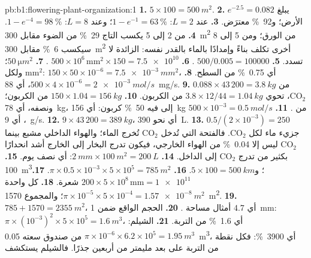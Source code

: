 \begin{solution}{pb:b1:flowering-plant-organization:1}
\textbf{1.} $5\times 100 = \qty{500}{m^2}$.
\textbf{2.} $e^{-2.5} = 0.082$ يبلغ الأرض؛ و\qty{92}{\%} معترَض.
\textbf{3.} عند $L = 2$: $1 - e^{-1} = \qty{63}{\%}$؛ وعند $L = 8$:
$1 -
e^{-4} = \qty{98}{\%}$.
\textbf{4.} من 2 إلى 5 يكسب التاج \qty{29}{\%} من الضوء مقابل
\qty{300}{m^2} من الورق؛ ومن 5 إلى 8 سيكسب \qty{6}{\%} مقابل
\qty{300}{m^2} أخرى تكلف بناءً وإمدادًا بالماء بالقدر نفسه: 
الزائدة لا تسدد.
\textbf{5.} $500/0.005 = \num{100000}$ .
\textbf{6.} $500\times 10^6\,\mathrm{mm^2}\times 150 = \num{7.5e10}$
.
\textbf{7.} $\qty{50}{\micro m^2}$؛ ولكل mm$^2$:
$150\times 50\times
10^{-6} = \qty{7.5e-3}{mm^2}$، أي \qty{0.75}{\%}
من السطح.
\textbf{8.} $500\times 4\times 10^{-6} = \qty{2e-3}{mol/s}$، أي
\qty{88}{mg/s}.
\textbf{9.} $0.088\times 43\,200 = \qty{3.8}{kg}$ من
$\mathrm{CO_2}$، تحوي $3.8\times 12/44 = \qty{1.04}{kg}$ من الكربون.
\textbf{10.} $150\times 1.04 = \qty{156}{kg}$ من الكربون؛ ونصفه، أي
\qty{78}{kg}، إلى  فيه \qty{50}{\%} كربون: أي \qty{156}{kg} من
.
\textbf{11.} $500\times 10^{-3} = \qty{0.5}{mol/s}$، أي \qty{9}{g/s}.
\textbf{12.} $9\times 43\,200 = \qty{389}{kg}$، أي نحو \qty{390}{L}.
\textbf{13.} $0.5/(2\times 10^{-3}) = 250$ جزيء ماء لكل
$\mathrm{CO_2}$. فالفتحة التي تُدخل $\mathrm{CO_2}$ تُخرج الماء؛
والهواء الداخلي مشبع بينما $\mathrm{CO_2}$ ليس إلا \qty{0.04}{\%} من
الهواء الخارجي، فيكون تدرج البخار إلى الخارج أشد انحدارًا بكثير من
تدرج $\mathrm{CO_2}$ إلى الداخل.
\textbf{14.} $\qty{2}{mm}\times\qty{100}{m^2} = \qty{200}{L}$: أي
نصف يوم.
\textbf{15.} \qty{100}{m^3}؛ و$5\times 100 = \qty{500}{km}$.
\textbf{16.} $\pi\times 0.5\times 10^{-3}\times 5\times 10^5 =
\qty{785}{m^2}$.
\textbf{17.} $200\times 5\times 10^8\,\mathrm{mm} = \num{1e11}$ شعرة.
\textbf{18.} كل واحدة $\pi\times 10^{-5}\times 5\times 10^{-4} =
\qty{1.57e-8}{m^2}$؛ والمجموع \qty{1570}{m^2}.
\textbf{19.} $785 + 1570 = \qty{2355}{m^2}$، أي $4.7$ أمثال مساحة
.
\textbf{20.} الحجم الواقع ضمن \qty{1}{mm}:
$\pi\times(10^{-3})^2\times 5
\times 10^5 = \qty{1.6}{m^3}$، أي
\qty{1.6}{\%} من التربة.
\textbf{21.} الشيلم: $\pi\times 10^{-6}\times 6.2\times 10^5 =
\qty{1.95}{m^3}$ من صندوق سعته \qty{0.05}{m^3}، أي \qty{3900}{\%}:
فكل نقطة من التربة على بعد مليمتر من أربعين جذرًا. فالشيلم يستكشف

\end{solution}
